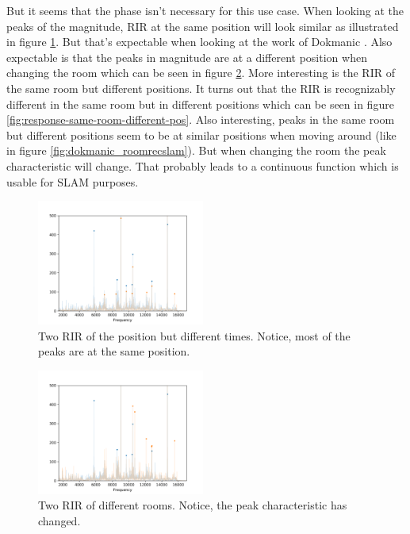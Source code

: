 But it seems that the phase isn't necessary for this use case. When looking at the peaks of the magnitude, RIR at the same position will look similar as illustrated in figure \ref{fig:response-same-room-same-pos}. But that's expectable when looking at the work of Dokmanic \cite{dokmanic_roomrecslam_2016}. Also expectable is that the peaks in magnitude are at a different position when changing the room which can be seen in figure \ref{fig:response-different-room}. More interesting is the RIR of the same room but different positions. It turns out that the RIR is recognizably different in the same room but in different positions which can be seen in figure \ref{fig:response-same-room-different-pos}. Also interesting, peaks in the same room but different positions seem to be at similar positions when moving around (like in figure \ref{fig:dokmanic_roomrecslam}). But when changing the room the peak characteristic will change. That probably leads to a continuous function which is usable for SLAM purposes.

\begin{figure}[h!]
	\centering
	\captionsetup{justification=centering,margin=1cm}
	\includegraphics[width=0.49\textwidth]{images/response-same-room-same-pos.png}
	\caption{
		Two RIR of the position but different times. Notice, most of the peaks are at the same position.
	}
	\label{fig:response-same-room-same-pos}
\end{figure}

\begin{figure}[h!]
	\centering
	\captionsetup{justification=centering,margin=1cm}
	\includegraphics[width=0.49\textwidth]{images/response-different-room.png}
	\caption{
		Two RIR of different rooms. Notice, the peak characteristic has changed.
	}
	\label{fig:response-different-room}
\end{figure}

